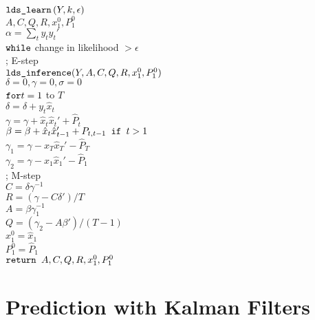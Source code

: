 \begin{algorithm}[h]
\begin{pseudocode}
\codename $\mbox{\texttt{lds\_learn}}\left(Y,k,\epsilon\right)$\\
\codeline $A, C, Q, R,x_1^0, P_1^0$\\
\codeline $\alpha = \sum_t y_ty_t'$\\ 
\codeline $\mbox{\texttt{while}}$ change in likelihood $> \epsilon$\\ 
\codeline \> ; E-step \\
\codeline \> $\mbox{\texttt{lds\_inference}}(Y,A,C,Q,R,x_1^0,P_1^0)$ \\
\codeline \> $\delta = 0, \gamma = 0, \sigma = 0$ \\
\codeline \> $\mbox{\texttt{for}} t = 1$ to $T$\\ 
\codeline \> \> $\delta = \delta + y_t\hat{x}_t$\\ 
\codeline \> \> $\gamma = \gamma + \hat{x}_t\hat{x}_t' + \hat{P}_t$\\ 
\codeline \> \> $\beta = \beta + \hat{x}_t\hat{x}_{t-1}' + P_{t,t-1} \mbox{\texttt{ if }} t>1$\\ 
\codeline \> $\gamma_1 = \gamma - \hat{x}_T\hat{x}_T' -\hat{P}_T$\\ 
\codeline \> $\gamma_2 = \gamma - \hat{x}_1\hat{x}_1' - \hat{P}_1$\\ 
\codeline \> ; M-step\\ 
\codeline \> $C = \delta \gamma^{-1}$\\ 
\codeline \> $R = (\gamma - C\delta')/T$\\ 
\codeline \> $A = \beta\gamma_1^{-1}$\\ 
\codeline \> $Q = (\gamma_2 - A\beta') / (T-1)$\\ 
\codeline \> $x_1^0 = \hat{x}_1$\\ 
\codeline \> $P_1^0 = \hat{P}_1$\\ 
\codeline $\mbox{\texttt{return }} A, C, Q, R, x_1^0, P_1^0$
\end{pseudocode}
\end{algorithm}




\section{Prediction with Kalman Filters}

